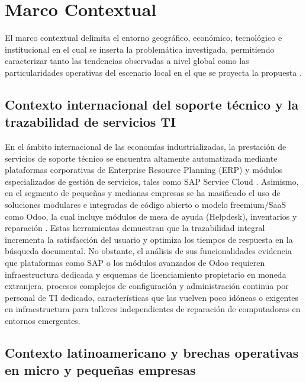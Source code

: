\section{Marco Contextual}

El marco contextual delimita el entorno geográfico, económico, tecnológico e institucional en el cual se inserta la problemática investigada, permitiendo caracterizar tanto las tendencias observadas a nivel global como las particularidades operativas del escenario local en el que se proyecta la propuesta \cite{hernandez2014}.

\subsection{Contexto internacional del soporte técnico y la trazabilidad de servicios TI}

En el ámbito internacional de las economías industrializadas, la prestación de servicios de soporte técnico se encuentra altamente automatizada mediante plataformas corporativas de Enterprise Resource Planning (ERP) y módulos especializados de gestión de servicios, tales como SAP Service Cloud \cite{sap2023}. Asimismo, en el segmento de pequeñas y medianas empresas se ha masificado el uso de soluciones modulares e integradas de código abierto o modelo freemium/SaaS como Odoo, la cual incluye módulos de mesa de ayuda (Helpdesk), inventarios y reparación \cite{odoo2024}. Estas herramientas demuestran que la trazabilidad integral incrementa la satisfacción del usuario y optimiza los tiempos de respuesta en la búsqueda documental. No obstante, el análisis de sus funcionalidades evidencia que plataformas como SAP o los módulos avanzados de Odoo requieren infraestructura dedicada y esquemas de licenciamiento propietario en moneda extranjera, procesos complejos de configuración y administración continua por personal de TI dedicado, características que las vuelven poco idóneas o exigentes en infraestructura para talleres independientes de reparación de computadoras en entornos emergentes.

\subsection{Contexto latinoamericano y brechas operativas en micro y pequeñas empresas}

